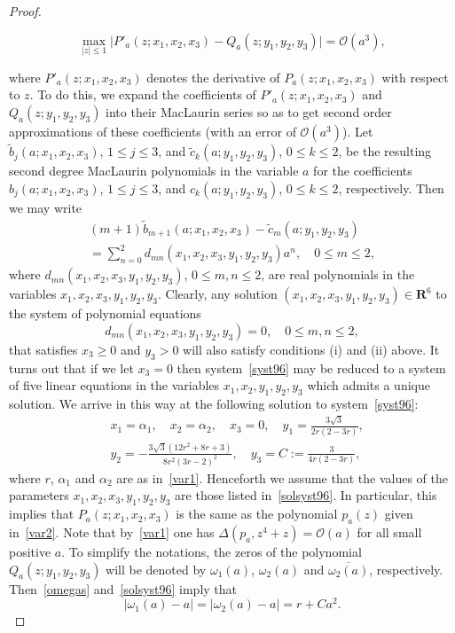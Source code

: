 \documentclass[10pt,twoside,a4paper,reqno]{amsart}
\theoremstyle{plain}
\theoremstyle{definition}
\begin{document}
{\begin{proof}
\begin{itemize}
$$\max_{|z|\le 1}\big|P'_a(z;x_1,x_2,x_3)-Q_a(z;y_1,y_2,y_3)\big|
=\mathcal{O}(a^3),$$
\end{itemize}
where $P'_a(z;x_1,x_2,x_3)$ denotes the derivative of $P_a(z;x_1,x_2,x_3)$ 
with respect to $z$. To do this, we expand the coefficients of 
$P'_a(z;x_1,x_2,x_3)$ and $Q_a(z;y_1,y_2,y_3)$ into their MacLaurin series 
so as to get second order approximations of these coefficients (with an error 
of $\mathcal{O}(a^3)$). Let $\tilde{b}_j(a;x_1,x_2,x_3)$, $1\le j\le 3$, and 
$\tilde{c}_k(a;y_1,y_2,y_3)$, $0\le k\le 2$, be the resulting second degree 
MacLaurin polynomials in the variable $a$ for the coefficients 
$b_j(a;x_1,x_2,x_3)$, $1\le j\le 3$, and $c_k(a;y_1,y_2,y_3)$, $0\le k\le 2$, 
respectively. Then we may write
\begin{multline}
(m+1)\tilde{b}_{m+1}(a;x_1,x_2,x_3)-\tilde{c}_{m}(a;y_1,y_2,y_3)\\
=\sum_{n=0}^{2}d_{mn}(x_1,x_2,x_3,y_1,y_2,y_3)a^n,\quad 0\le m\le 2,
\end{multline}
where $d_{mn}(x_1,x_2,x_3,y_1,y_2,y_3)$, $0\le m,n\le 2$, are 
real polynomials in the variables $x_1,x_2,x_3,y_1,y_2,y_3$.
Clearly, any solution $(x_1,x_2,x_3,y_1,y_2,y_3)\in \mathbf{R}^6$ to the 
system of polynomial equations
\begin{equation}\label{syst96}
d_{mn}(x_1,x_2,x_3,y_1,y_2,y_3)=0,\quad 0\le m,n\le 2,
\end{equation}
that satisfies $x_3\ge 0$ and $y_3>0$ will also satisfy conditions (i) and 
(ii) above. It turns out that if we let $x_3=0$ then system~\eqref{syst96} 
may be reduced to a system of five linear equations in the variables 
$x_1,x_2,y_1,y_2,y_3$ which admits a unique solution. We arrive in this way 
at the following solution to system~\eqref{syst96}:
\begin{equation}\label{solsyst96}
\begin{split}
&x_1=\alpha_1,\quad x_2=\alpha_2,\quad x_3=0,\quad 
y_1=\frac{3\sqrt{3}}{2r(2-3r)},\\
&y_2=-\frac{3\sqrt{3}(12r^2+8r+3)}{8r^2(3r-2)^2},
\quad y_3=C:=\frac{3}{4r(2-3r)},
\end{split}
\end{equation}
where $r$, $\alpha_1$ and $\alpha_2$ are as in~\eqref{var1}. Henceforth we 
assume that the values of the parameters $x_1,x_2,x_3,y_1,y_2,y_3$ are those 
listed in~\eqref{solsyst96}. In particular, this implies that 
$P_a(z;x_1,x_2,x_3)$ is the same as the polynomial $p_a(z)$ given 
in~\eqref{var2}. Note that by~\eqref{var1} one has 
$\Delta(p_a,z^4+z)=\mathcal{O}(a)$ for all small positive $a$. To simplify 
the notations, the zeros of the polynomial $Q_a(z;y_1,y_2,y_3)$ will be 
denoted by $\omega_1(a)$, $\omega_2(a)$ and $\overline{\omega_2(a)}$, 
respectively. Then~\eqref{omegas} and~\eqref{solsyst96} imply that
\begin{equation}\label{concl}
|\omega_1(a)-a|=|\omega_2(a)-a|=r+Ca^2.
\end{equation}


\end{proof}}
\end{document}
